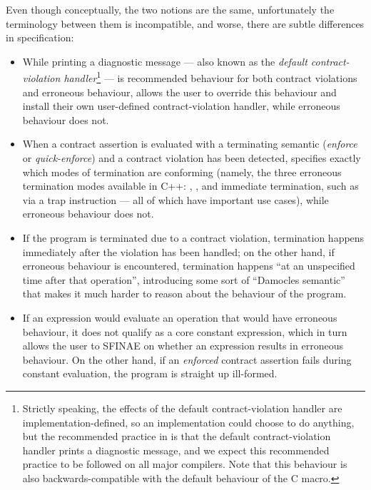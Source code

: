 Even though conceptually, the two notions are the same, unfortunately the terminology between them is incompatible, and worse, there are subtle differences in specification:
\begin{itemize}
\item While printing a diagnostic message --- also known as the \emph{default contract-violation handler}\footnote{Strictly speaking, the effects of the default contract-violation handler are implementation-defined, so an implementation could choose to do anything, but the recommended practice in \cite{P2900R13} is that the default contract-violation handler prints a diagnostic message, and we expect this recommended practice to be followed on all major compilers. Note that this behaviour is also backwards-compatible with the default behaviour of the C  macro.} --- is recommended behaviour for both contract violations and erroneous behaviour, \cite{P2900R13} allows the user to override this behaviour and install their own user-defined contract-violation handler, while erroneous behaviour does not. 

\item When a contract assertion is evaluated with a terminating semantic (\emph{enforce} or \emph{quick-enforce}) and a contract violation has been detected, \cite{P2900R13} specifies exactly which modes of termination are conforming (namely, the three erroneous termination modes available in C++: , , and immediate termination, such as via a trap instruction --- all of which have important use cases), while erroneous behaviour does not.

\item If the program is terminated due to a contract violation, termination happens immediately after the violation has been handled; on the other hand, if erroneous behaviour is encountered, termination happens ``at an unspecified time after that operation'', introducing some sort of ``Damocles semantic'' that makes it much harder to reason about the behaviour of the program.

\item If an expression would evaluate an operation that would have erroneous behaviour, it does not qualify as a core constant expression, which in turn allows the user to SFINAE on whether an expression results in erroneous behaviour. On the other hand, if an \emph{enforced} contract assertion fails during constant evaluation, the program is straight up ill-formed. 
\end{itemize}

